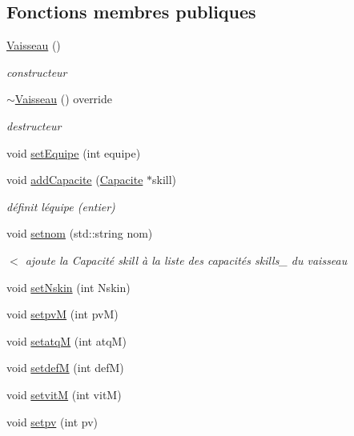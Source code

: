\subsection*{Fonctions membres publiques}
\begin{DoxyCompactItemize}
\item 
\hyperlink{class_vaisseau_a86378a70f0d92fcc6c5c5973574b2b7d}{Vaisseau} ()
\begin{DoxyCompactList}\small\item\em constructeur \end{DoxyCompactList}\item 
\hyperlink{class_vaisseau_a3360bd62af7a7aaf5732b86d639a0674}{$\sim$\+Vaisseau} () override
\begin{DoxyCompactList}\small\item\em destructeur \end{DoxyCompactList}\item 
void \hyperlink{class_vaisseau_a1b3edda1f99d55cb5c0c7cbafe156af6}{set\+Equipe} (int equipe)
\item 
void \hyperlink{class_vaisseau_a04d7069231187e7dba26a06a0aaf2508}{add\+Capacite} (\hyperlink{class_capacite}{Capacite} $\ast$skill)
\begin{DoxyCompactList}\small\item\em définit l\textquotesingle{}équipe (entier) \end{DoxyCompactList}\item 
void \hyperlink{class_vaisseau_a46174e710a959996ac9ae56f11757e61}{setnom} (std\+::string nom)
\begin{DoxyCompactList}\small\item\em $<$ ajoute la {\ttfamily Capacité} skill à la liste des capacités skills\+\_\+ du vaisseau \end{DoxyCompactList}\item 
void \hyperlink{class_vaisseau_a0d57458dc32dde2d8326c20f25172bab}{set\+Nskin} (int Nskin)
\item 
void \hyperlink{class_vaisseau_a10a33c8fed1bb1530148e98313d80a87}{setpvM} (int pvM)
\item 
void \hyperlink{class_vaisseau_ac1eaf0b717e81471f259ce94ad0afb20}{setatqM} (int atqM)
\item 
void \hyperlink{class_vaisseau_a4120a8c40229b8af08590ee3a6d00f6a}{setdefM} (int defM)
\item 
void \hyperlink{class_vaisseau_a5816b1761b1d6f12f2ee3077b938392a}{setvitM} (int vitM)
\item 
void \hyperlink{class_vaisseau_a2c9cf0b0520a6bee6408af58e3c99e34}{setpv} (int pv)

\end{DoxyCompactItemize}
